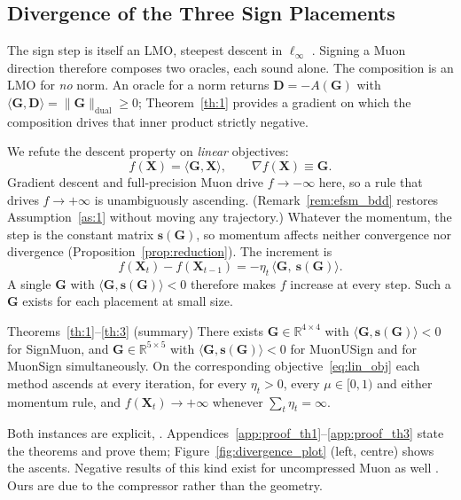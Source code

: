 \subsection{Divergence of the Three Sign Placements}
The sign step is itself an LMO, steepest descent in $\ell_\infty$ \citep{bernstein2024old}. Signing a Muon direction therefore composes two oracles, each sound alone. The composition is an LMO for \emph{no} norm. An oracle for a norm returns $\mathbf{D}=-A(\mathbf{G})$ with $\langle\mathbf{G},\mathbf{D}\rangle=\|\mathbf{G}\|_{\mathrm{dual}}\ge0$; Theorem~\ref{th:1} provides a gradient on which the composition drives that inner product strictly negative.

We refute the descent property on \emph{linear} objectives:
\begin{equation}
\label{eq:lin_obj}
f(\mathbf{X})=\langle \mathbf{G},\mathbf{X}\rangle,\qquad \nabla f(\mathbf{X})\equiv \mathbf{G}.
\end{equation}
Gradient descent and full-precision Muon drive $f\to-\infty$ here, so a rule that drives $f\to+\infty$ is unambiguously ascending. (Remark~\ref{rem:efsm_bdd} restores Assumption~\ref{as:1} without moving any trajectory.) Whatever the momentum, the step is the constant matrix $\mathbf{s}(\mathbf{G})$, so momentum affects neither convergence nor divergence (Proposition~\ref{prop:reduction}). The increment is
\begin{equation}
\label{eq:lin_increment}
f(\mathbf{X}_{t})-f(\mathbf{X}_{t-1})=-\eta_t\,\bigl\langle \mathbf{G},\ \mathbf{s}(\mathbf{G})\bigr\rangle .
\end{equation}
A single $\mathbf{G}$ with $\langle\mathbf{G},\mathbf{s}(\mathbf{G})\rangle<0$ therefore makes $f$ increase at every step. Such a $\mathbf{G}$ exists for each placement at small size.

\begin{summarythm}{Theorems~\ref{th:1}--\ref{th:3} (summary)}
There exists $\mathbf{G}\in\mathbb{R}^{4\times4}$ with $\langle\mathbf{G},\mathbf{s}(\mathbf{G})\rangle<0$ for SignMuon, and $\mathbf{G}\in\mathbb{R}^{5\times5}$ with $\langle\mathbf{G},\mathbf{s}(\mathbf{G})\rangle<0$ for MuonUSign and for MuonSign simultaneously. On the corresponding objective~\eqref{eq:lin_obj} each method ascends at every iteration, for every $\eta_t>0$, every $\mu\in[0,1)$ and either momentum rule, and $f(\mathbf{X}_t)\to+\infty$ whenever $\sum_t\eta_t=\infty$.
\end{summarythm}

Both instances are explicit, . Appendices~\ref{app:proof_th1}--\ref{app:proof_th3} state the theorems and prove them; Figure~\ref{fig:divergence_plot} (left, centre) shows the ascents. Negative results of this kind exist for uncompressed Muon as well \citep{parshakova2026muondoesconvergeconvex}. Ours are due to the compressor rather than the geometry.


